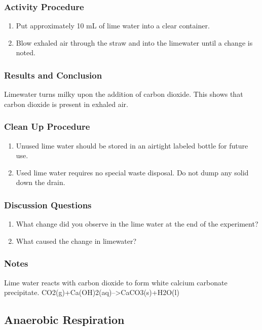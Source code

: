 \subsubsection*{Activity Procedure}
\begin{enumerate}
\item{Put approximately 10 mL of lime water into a clear container.}
\item{Blow exhaled air through the straw and into the limewater until a change is noted.}
\end{enumerate}

\subsubsection*{Results and Conclusion}
Limewater turns milky upon the addition of carbon dioxide. This shows that carbon dioxide is present in exhaled air.

\subsubsection*{Clean Up Procedure}
\begin{enumerate}
\item{Unused lime water should be stored in an airtight labeled bottle for future use.}
\item{Used lime water requires no special waste disposal. Do not dump any solid down the drain.}
\end{enumerate}

\subsubsection*{Discussion Questions}
\begin{enumerate}
\item{What change did you observe in the lime water at the end of the experiment?}
\item{What caused the change in limewater?}
\end{enumerate}

\subsubsection*{Notes}
Lime water reacts with carbon dioxide to form white calcium carbonate precipitate.
CO2(g)+Ca(OH)2(aq)-->CaCO3(s)+H2O(l)


\subsection{Anaerobic Respiration}


